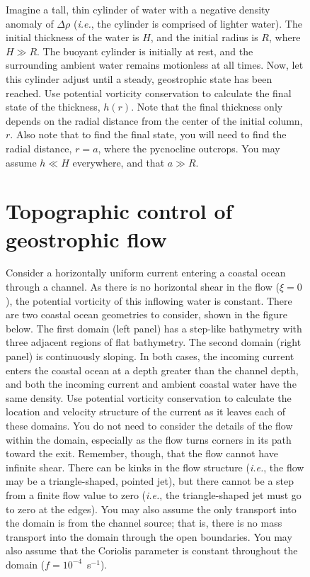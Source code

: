 \documentclass[11pt]{report}
\numberwithin{equation}{section}
\begin{document}
\begin{figure}
Imagine a tall, thin cylinder of water with a negative density anomaly of $\Delta\rho$ (\emph{i.e.}, the cylinder is comprised of lighter water).  The initial thickness of the water is $H$, and the initial radius is $R$, where $H\gg{}R$.  The buoyant cylinder is initially at rest, and the surrounding ambient water remains motionless at all times.  Now, let this cylinder adjust until a steady, geostrophic state has been reached.  Use potential vorticity conservation to calculate the final state of the thickness, $h(r)$.  Note that the final thickness only depends on the radial distance from the center of the initial column, $r$.  Also note that to find the final state, you will need to find the radial distance, $r=a$, where the pycnocline outcrops.  You may assume $h\ll{}H$ everywhere, and that $a\gg{}R$.

\clearpage
\section{Topographic control of geostrophic flow}
\label{prob:topo_geostrophic_flow}

Consider a horizontally uniform current entering a coastal ocean through a channel.  As there is no horizontal shear in the flow ($\xi = 0$), the potential vorticity of this inflowing water is constant.  There are two coastal ocean geometries to consider, shown in the figure below.  The first domain (left panel) has a step-like bathymetry with three adjacent regions of flat bathymetry.  The second domain (right panel) is continuously sloping.  In both cases, the incoming current enters the coastal ocean at a depth greater than the channel depth, and both the incoming current and ambient coastal water have the same density.  Use potential vorticity conservation to calculate the location and velocity structure of the current as it leaves each of these domains.  You do not need to consider the details of the flow within the domain, especially as the flow turns corners in its path toward the exit.  Remember, though, that the flow cannot have infinite shear.  There can be kinks in the flow structure (\emph{i.e.}, the flow may be a triangle-shaped, pointed jet), but there cannot be a step from a finite flow value to zero (\emph{i.e.}, the triangle-shaped jet must go to zero at the edges).  You may also assume the only transport into the domain is from the channel source; that is, there is no mass transport into the domain through the open boundaries.  You may also assume that the Coriolis parameter is constant throughout the domain ($f=10^{-4}$~s$^{-1}$).


\end{figure}
\end{document}
